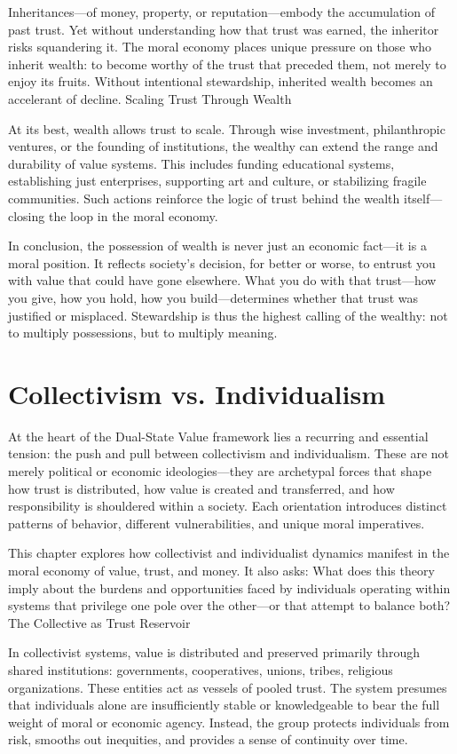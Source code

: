 \documentclass[11pt,oneside]{book}
\begin{document}
Inheritances—of money, property, or reputation—embody the accumulation of past trust. Yet without understanding how that trust was earned, the inheritor risks squandering it. The moral economy places unique pressure on those who inherit wealth: to become worthy of the trust that preceded them, not merely to enjoy its fruits. Without intentional stewardship, inherited wealth becomes an accelerant of decline.
Scaling Trust Through Wealth

At its best, wealth allows trust to scale. Through wise investment, philanthropic ventures, or the founding of institutions, the wealthy can extend the range and durability of value systems. This includes funding educational systems, establishing just enterprises, supporting art and culture, or stabilizing fragile communities. Such actions reinforce the logic of trust behind the wealth itself—closing the loop in the moral economy.

In conclusion, the possession of wealth is never just an economic fact—it is a moral position. It reflects society’s decision, for better or worse, to entrust you with value that could have gone elsewhere. What you do with that trust—how you give, how you hold, how you build—determines whether that trust was justified or misplaced. Stewardship is thus the highest calling of the wealthy: not to multiply possessions, but to multiply meaning.


\chapter{Collectivism vs. Individualism}

At the heart of the Dual-State Value framework lies a recurring and essential tension: the push and pull between collectivism and individualism. These are not merely political or economic ideologies—they are archetypal forces that shape how trust is distributed, how value is created and transferred, and how responsibility is shouldered within a society. Each orientation introduces distinct patterns of behavior, different vulnerabilities, and unique moral imperatives.

This chapter explores how collectivist and individualist dynamics manifest in the moral economy of value, trust, and money. It also asks: What does this theory imply about the burdens and opportunities faced by individuals operating within systems that privilege one pole over the other—or that attempt to balance both?
The Collective as Trust Reservoir

In collectivist systems, value is distributed and preserved primarily through shared institutions: governments, cooperatives, unions, tribes, religious organizations. These entities act as vessels of pooled trust. The system presumes that individuals alone are insufficiently stable or knowledgeable to bear the full weight of moral or economic agency. Instead, the group protects individuals from risk, smooths out inequities, and provides a sense of continuity over time.
\end{document}
